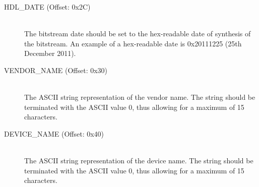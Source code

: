 \documentclass{article}
\begin{document}
\begin{description}
\item[HDL\_DATE (Offset: 0x2C)] \hfill \\
The bitstream date should be set to the hex-readable date of synthesis of
the bitstream. An example of a hex-readable date is 0x20111225 (25th December
2011).

\item[VENDOR\_NAME (Offset: 0x30)] \hfill \\
The ASCII string representation of the vendor name. The string should be
terminated with the ASCII value 0, thus allowing for a maximum of 15
characters.

\item[DEVICE\_NAME (Offset: 0x40)] \hfill \\
The ASCII string representation of the device name. The string should be
terminated with the ASCII value 0, thus allowing for a maximum of 15
characters.
\end{description}
\end{document}

